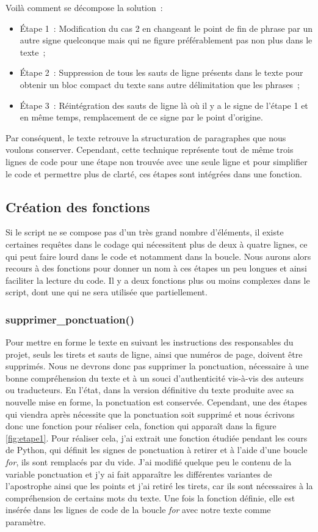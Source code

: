 Voilà comment se décompose la solution~:
\begin{itemize}
    \item Étape 1~: Modification du cas 2 en changeant le point de fin de phrase par un autre signe quelconque mais qui ne figure préférablement pas non plus dans le texte~;
    \item Étape 2~: Suppression de tous les sauts de ligne présents dans le texte pour obtenir un bloc compact du texte sans autre délimitation que les phrases~;
    \item Étape 3~: Réintégration des sauts de ligne là où il y a le signe de l'étape 1 et en même temps, remplacement de ce signe par le point d'origine.
\end{itemize}
Par conséquent, le texte retrouve la structuration de paragraphes que nous voulons conserver. Cependant, cette technique représente tout de même trois lignes de code pour une étape non trouvée avec une seule ligne et pour simplifier le code et permettre plus de clarté, ces étapes sont intégrées dans une fonction.

\subsection{Création des fonctions}
Si le script ne se compose pas d'un très grand nombre d'éléments, il existe certaines requêtes dans le codage qui nécessitent plus de deux à quatre lignes, ce qui peut faire lourd dans le code et notamment dans la boucle. Nous aurons alors recours à des fonctions pour donner un nom à ces étapes un peu longues et ainsi faciliter la lecture du code. Il y a deux fonctions plus ou moins complexes dans le script, dont une qui ne sera utilisée que partiellement.

\subsubsection{supprimer\_ponctuation()}
Pour mettre en forme le texte en suivant les instructions des responsables du projet, seuls les tirets et sauts de ligne, ainsi que numéros de page, doivent être supprimés. Nous ne devrons donc pas supprimer la ponctuation, nécessaire à une bonne compréhension du texte et à un souci d'authenticité vis-à-vis des auteurs ou traducteurs. En l'état, dans la version définitive du texte produite avec sa nouvelle mise en forme, la ponctuation est conservée. Cependant, une des étapes qui viendra après nécessite que la ponctuation soit supprimé et nous écrivons donc une fonction pour réaliser cela, fonction qui apparaît dans la figure \ref{fig:etape1}. Pour réaliser cela, j'ai extrait une fonction étudiée pendant les cours de Python, qui définit les signes de ponctuation à retirer et à l'aide d'une boucle \emph{for}, ils sont remplacés par du vide. J'ai modifié quelque peu le contenu de la variable ponctuation et j'y ai fait apparaître les différentes variantes de l'apostrophe ainsi que les points et j'ai retiré les tirets, car ils sont nécessaires à la compréhension de certains mots du texte. Une fois la fonction définie, elle est insérée dans les lignes de code de la boucle \emph{for} avec notre texte comme paramètre.

